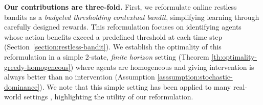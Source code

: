 \textbf{Our contributions are three-fold.} {First},
we reformulate
online restless bandits as a \emph{budgeted thresholding contextual bandit}, simplifying learning through carefully designed rewards. 
This reformulation focuses on
identifying agents whose action benefits
exceed a predefined threshold at each time step (Section~\ref{section:restless-bandit}).
We establish the optimality of this reformulation in a simple 2-state, \emph{finite horizon} setting (Theorem \ref{th:optimality-greedy-homogeneous}) where agents are homogeneous and giving intervention is always better than no intervention (Assumption \ref{asssumption:stochastic-dominance}).  
We note that this simple setting has been applied to many real-world settings \citep{wang2023scalable,killian2023robust,liang2024bayesian,raman2024global},
highlighting the utility of our reformulation.  
% 
% 


